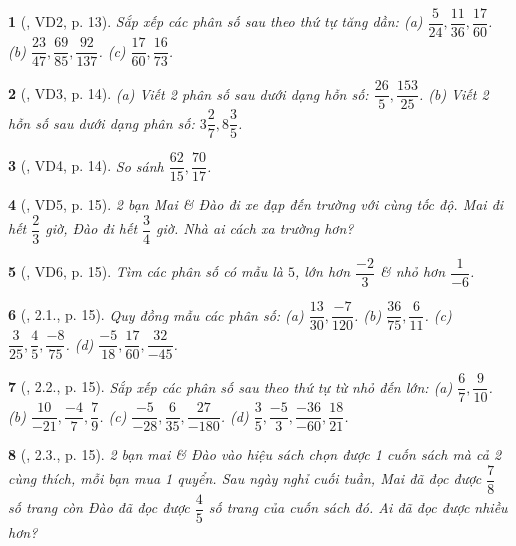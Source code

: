 \documentclass{article}
\newtheorem{baitoan}{}
\begin{document}
\begin{baitoan}[\cite{Binh_boi_duong_Toan_6_tap_2}, VD2, p. 13]
	Sắp xếp các phân số sau theo thứ tự tăng dần: (a) $\dfrac{5}{24},\dfrac{11}{36},\dfrac{17}{60}$. (b) $\dfrac{23}{47},\dfrac{69}{85},\dfrac{92}{137}$. (c) $\dfrac{17}{60},\dfrac{16}{73}$.
\end{baitoan}

\begin{baitoan}[\cite{Binh_boi_duong_Toan_6_tap_2}, VD3, p. 14]
	(a) Viết 2 phân số sau dưới dạng hỗn số: $\dfrac{26}{5},\dfrac{153}{25}$. (b) Viết 2 hỗn số sau dưới dạng phân số: $3\dfrac{2}{7},8\dfrac{3}{5}$.
\end{baitoan}

\begin{baitoan}[\cite{Binh_boi_duong_Toan_6_tap_2}, VD4, p. 14]
	So sánh $\dfrac{62}{15},\dfrac{70}{17}$.
\end{baitoan}

\begin{baitoan}[\cite{Binh_boi_duong_Toan_6_tap_2}, VD5, p. 15]
	2 bạn Mai \& Đào đi xe đạp đến trường với cùng tốc độ. Mai đi hết $\dfrac{2}{3}$ giờ, Đào đi hết $\dfrac{3}{4}$ giờ. Nhà ai cách xa trường hơn?
\end{baitoan}

\begin{baitoan}[\cite{Binh_boi_duong_Toan_6_tap_2}, VD6, p. 15]
	Tìm các phân số có mẫu là $5$, lớn hơn $\dfrac{-2}{3}$ \& nhỏ hơn $\dfrac{1}{-6}$.
\end{baitoan}

\begin{baitoan}[\cite{Binh_boi_duong_Toan_6_tap_2}, 2.1., p. 15]
	Quy đồng mẫu các phân số: (a) $\dfrac{13}{30},\dfrac{-7}{120}$. (b) $\dfrac{36}{75},\dfrac{6}{11}$. (c) $\dfrac{3}{25},\dfrac{4}{5},\dfrac{-8}{75}$. (d) $\dfrac{-5}{18},\dfrac{17}{60},\dfrac{32}{-45}$.
\end{baitoan}

\begin{baitoan}[\cite{Binh_boi_duong_Toan_6_tap_2}, 2.2., p. 15]
	Sắp xếp các phân số sau theo thứ tự từ nhỏ đến lớn: (a) $\dfrac{6}{7},\dfrac{9}{10}$. (b) $\dfrac{10}{-21},\dfrac{-4}{7},\dfrac{7}{9}$. (c) $\dfrac{-5}{-28},\dfrac{6}{35},\dfrac{27}{-180}$. (d) $\dfrac{3}{5},\dfrac{-5}{3},\dfrac{-36}{-60},\dfrac{18}{21}$.
\end{baitoan}

\begin{baitoan}[\cite{Binh_boi_duong_Toan_6_tap_2}, 2.3., p. 15]
	2 bạn mai \& Đào vào hiệu sách chọn được 1 cuốn sách mà cả 2 cùng thích, mỗi bạn mua 1 quyển. Sau ngày nghỉ cuối tuần, Mai đã đọc được $\dfrac{7}{8}$ số trang còn Đào đã đọc được $\dfrac{4}{5}$ số trang của cuốn sách đó. Ai đã đọc được nhiều hơn?
\end{baitoan}
\end{document}
